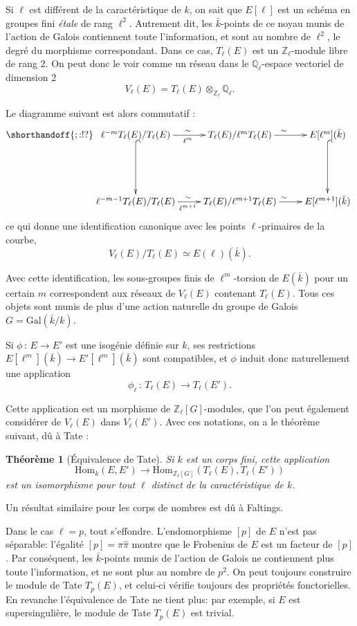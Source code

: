 \documentclass[11pt,a4paper]{article}
\newcommand{\Z}{\mathbb{Z}}
\newcommand{\Q}{\mathbb{Q}}
\newcommand{\vers}{\longrightarrow}
\newcommand{\Hom}{\mathrm{Hom}}
\newcommand{\de}{\,:\,}
\renewcommand{\v}{\vspace{5mm}}
\newtheorem*{thm}{Théorème}
\theoremstyle{definition}
\begin{document}
Si $\ell$ est différent de la caractéristique de $k$, on sait que $E[\ell]$ est un schéma en groupes fini \emph{étale} de rang $\ell^2$. Autrement dit, les $\bar{k}$-points de ce noyau munis de l'action de Galois contiennent toute l'information, et sont au nombre de $\ell^2$, le degré du morphisme correspondant. Dans ce cas, $T_\ell(E)$ est un $\Z_\ell$-module libre de rang 2. On peut donc le voir comme un réseau dans le $\Q_\ell$-espace vectoriel de dimension 2
$$V_\ell(E) = T_\ell(E) \otimes_{\Z_\ell} \Q_\ell.$$

Le diagramme suivant est alors commutatif :
$$
\shorthandoff{;:!?}
\xymatrix {
\ell^{-m} T_\ell(E)/ T_\ell(E) \ar[r]_{\ell^m}^{\sim} \ar@{^{(}->}[dd]&
 T_\ell(E)/ \ell^m T_\ell(E) \ar[r]^{\sim}  & 
 E[\ell^m](\bar{k}) \ar@{^{(}->}[dd] \\ 
 \\
 \ell^{-m-1} T_\ell(E)/ T_\ell(E) \ar[r]_{\ell^{m+1}}^{\sim} &
 T_\ell(E)/ \ell^{m+1} T_\ell(E) \ar[r]^{\sim}  & 
 E[\ell^{m+1}](\bar{k})
}
$$
ce qui donne une identification canonique avec les points $\ell$-primaires de la courbe,
$$ V_\ell(E)/ T_\ell(E) \simeq E(\ell)(\bar{k}).$$

Avec cette identification, les sous-groupes finis de $\ell^m$-torsion de $E(\bar{k})$ pour un certain $m$ correspondent aux réseaux de $V_\ell(E)$ contenant $T_\ell(E)$. Tous ces objets sont munis de plus d'une action naturelle du groupe de Galois $G= \mathrm{Gal}(\bar{k}/k)$.

Si $\phi\de E\vers E'$ est une isogénie définie sur $k$, ses restrictions $E[\ell^m](\bar{k})\vers E'[\ell^m](\bar{k})$ sont compatibles, et $\phi$ induit donc naturellement une application
$$ \phi_\ell\de T_\ell(E)\vers T_\ell(E').$$

Cette application est un morphisme de $\Z_\ell[G]$-modules, que l'on peut également considérer de $V_\ell(E)$ dans $V_\ell(E')$. Avec ces notations, on a le théorème suivant, dû à Tate :

\begin{thm}[Équivalence de Tate] Si $k$ est un corps fini, cette application
$$\Hom_k(E, E') \vers \Hom_{\Z_\ell[G]} (T_\ell(E), T_\ell(E'))$$
est un isomorphisme pour tout $\ell$ distinct de la caractéristique de $k$.
\end{thm}

Un résultat similaire pour les corps de nombres est dû à Faltings.
\v

Dans le cas $\ell=p$, tout s'effondre. L'endomorphisme $[p]$ de $E$ n'est pas séparable: l'égalité
$[p] = \pi \hat{\pi}$
montre que le Frobenius de $E$ est un facteur de $[p]$. Par conséquent, les $\bar{k}$-points munis de l'action de Galois ne contiennent plus toute l'information, et ne sont plus au nombre de $p^2$. On peut toujours construire le module de Tate $T_p(E)$, et celui-ci vérifie toujours des propriétés fonctorielles. En revanche l'équivalence de Tate ne tient plus: par exemple, si $E$ est supersingulière, le module de Tate $T_p(E)$ est trivial.
\end{document}
